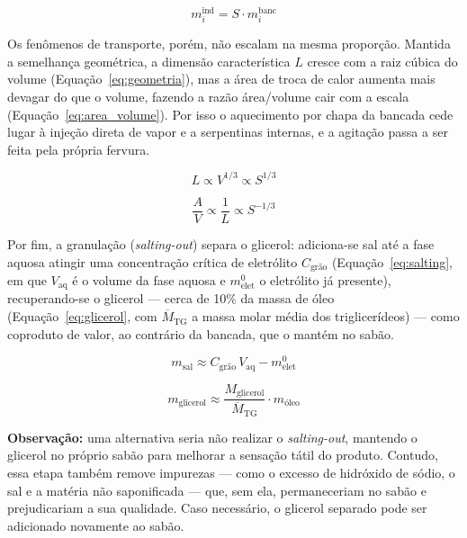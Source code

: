 \begin{equation}
    m_i^{\text{ind}} = S \cdot m_i^{\text{banc}}
    \label{eq:massa_escala}
\end{equation}

Os fenômenos de transporte, porém, não escalam na mesma proporção. Mantida a semelhança geométrica, a dimensão característica $L$ cresce com a raiz cúbica do volume (Equação~\ref{eq:geometria}), mas a área de troca de calor aumenta mais devagar do que o volume, fazendo a razão área/volume cair com a escala (Equação~\ref{eq:area_volume}). Por isso o aquecimento por chapa da bancada cede lugar à injeção direta de vapor e a serpentinas internas, e a agitação passa a ser feita pela própria fervura.

\begin{equation}
    L \propto V^{1/3} \propto S^{1/3}
    \label{eq:geometria}
\end{equation}

\begin{equation}
    \frac{A}{V} \propto \frac{1}{L} \propto S^{-1/3}
    \label{eq:area_volume}
\end{equation}

Por fim, a granulação (\textit{salting-out}) separa o glicerol: adiciona-se sal até a fase aquosa atingir uma concentração crítica de eletrólito $C_{\text{grão}}$ (Equação~\ref{eq:salting}, em que $V_{\text{aq}}$ é o volume da fase aquosa e $m_{\text{elet}}^{0}$ o eletrólito já presente), recuperando-se o glicerol — cerca de 10\% da massa de óleo (Equação~\ref{eq:glicerol}, com $\overline{M}_{\text{TG}}$ a massa molar média dos triglicerídeos) — como coproduto de valor, ao contrário da bancada, que o mantém no sabão.

\begin{equation}
    m_{\text{sal}} \approx C_{\text{grão}}\,V_{\text{aq}} - m_{\text{elet}}^{0}
    \label{eq:salting}
\end{equation}

\begin{equation}
    m_{\text{glicerol}} \approx \frac{M_{\text{glicerol}}}{\overline{M}_{\text{TG}}} \cdot m_{\text{óleo}}
    \label{eq:glicerol}
\end{equation}

\textbf{Observação:} uma alternativa seria não realizar o \textit{salting-out}, mantendo o glicerol no próprio sabão para melhorar a sensação tátil do produto. Contudo, essa etapa também remove impurezas — como o excesso de hidróxido de sódio, o sal e a matéria não saponificada — que, sem ela, permaneceriam no sabão e prejudicariam a sua qualidade. Caso necessário, o glicerol separado pode ser adicionado novamente ao sabão.